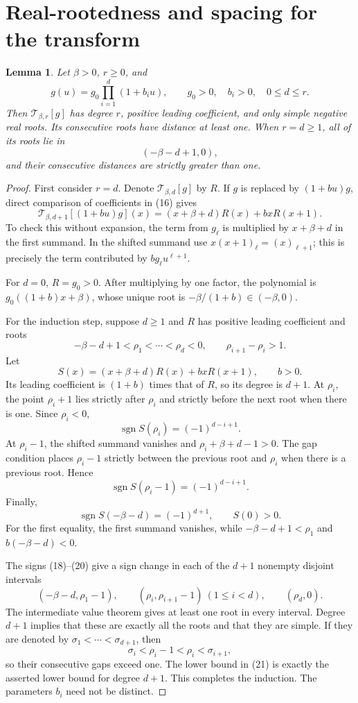 \documentclass[11pt,a4paper]{article}
\newtheorem{lemma}[theorem]{Lemma}
\begin{document}
\section{Real-rootedness and spacing for the transform}\label{sec:spacing}
\begin{lemma}
Let $\beta>0$, $r\geq0$, and
\[
 g(u)=g_0\prod_{i=1}^d(1+b_i u),\qquad
 g_0>0,\quad b_i>0,\quad 0\leq d\leq r.
\]
Then $\mathcal T_{\beta,r}[g]$ has degree $r$, positive leading coefficient, and only simple negative real roots. Its consecutive roots have distance at least one. When $r=d\geq1$, all of its roots lie in
\[
 (-\beta-d+1,0),
\]
and their consecutive distances are strictly greater than one.
\end{lemma}

\begin{proof} First consider $r=d$. Denote $\mathcal T_{\beta,d}[g]$ by $R$. If $g$ is replaced by $(1+bu)g$, direct comparison of coefficients in (16) gives
\[
 \mathcal T_{\beta,d+1}[(1+bu)g](x)
 =(x+\beta+d)R(x)+b xR(x+1). \tag{17}
\]
To check this without expansion, the term from $g_\ell$ is multiplied by $x+\beta+d$ in the first summand. In the shifted summand use $x(x+1)_\ell=(x)_{\ell+1}$; this is precisely the term contributed by $b g_\ell u^{\ell+1}$.

For $d=0$, $R=g_0>0$. After multiplying by one factor, the polynomial is $g_0((1+b)x+\beta)$, whose unique root is $-\beta/(1+b)\in(-\beta,0)$.

For the induction step, suppose $d\geq1$ and $R$ has positive leading coefficient and roots
\[
 -\beta-d+1<\rho_1<\cdots<\rho_d<0,
 \qquad \rho_{i+1}-\rho_i>1.
\]
Let
\[
 S(x)=(x+\beta+d)R(x)+b xR(x+1),\qquad b>0.
\]
Its leading coefficient is $(1+b)$ times that of $R$, so its degree is $d+1$. At $\rho_i$, the point $\rho_i+1$ lies strictly after $\rho_i$ and strictly before the next root when there is one. Since $\rho_i<0$,
\[
 \operatorname{sgn}S(\rho_i)=(-1)^{d-i+1}. \tag{18}
\]
At $\rho_i-1$, the shifted summand vanishes and $\rho_i+\beta+d-1>0$. The gap condition places $\rho_i-1$ strictly between the previous root and $\rho_i$ when there is a previous root. Hence
\[
 \operatorname{sgn}S(\rho_i-1)=(-1)^{d-i+1}. \tag{19}
\]
Finally,
\[
 \operatorname{sgn}S(-\beta-d)=(-1)^{d+1},\qquad S(0)>0. \tag{20}
\]
For the first equality, the first summand vanishes, while $-\beta-d+1<\rho_1$ and $b(-\beta-d)<0$.

The signs (18)--(20) give a sign change in each of the $d+1$ nonempty disjoint intervals
\[
 (-\beta-d,\rho_1-1),\qquad
 (\rho_i,\rho_{i+1}-1)\ (1\leq i<d),\qquad
 (\rho_d,0). \tag{21}
\]
The intermediate value theorem gives at least one root in every interval. Degree $d+1$ implies that these are exactly all the roots and that they are simple. If they are denoted by $\sigma_1<\cdots<\sigma_{d+1}$, then
\[
 \sigma_i<\rho_i-1<\rho_i<\sigma_{i+1},
\]
so their consecutive gaps exceed one. The lower bound in (21) is exactly the asserted lower bound for degree $d+1$. This completes the induction. The parameters $b_i$ need not be distinct.


\end{proof}
\end{document}
